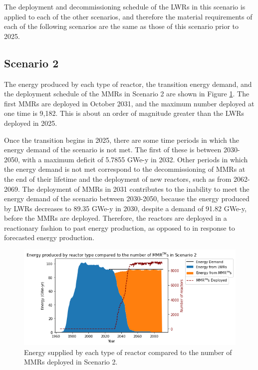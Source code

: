 The deployment and decommissioning schedule of the \glspl{LWR} in this 
scenario is 
applied to each of the other scenarios, and therefore the material 
requirements of each of the following scenarios are the same as those 
of this scenario prior to 2025. 

\subsection{Scenario 2}
The energy produced by each type of reactor, the transition energy demand, 
and the deployment schedule of the \glspl{MMR} in Scenario 2 are shown in 
Figure \ref{fig:energy_rx_2}. The first \glspl{MMR} are deployed in 
October 2031, and the 
maximum number deployed at one time is 
9,182. This is about an order of magnitude greater than the \glspl{LWR}
deployed in 2025.

Once the transition begins in 2025, there are some time periods in which 
the energy demand of the scenario is 
not met. The first of these is between 2030-2050, with a maximum deficit 
of 5.7855 GWe-y in 2032. Other periods in which the energy demand is not met 
correspond to the decommissioning of \glspl{MMR} at the end of their lifetime 
and the deployment of new reactors, such as from 2062-2069. 
The deployment of \glspl{MMR} in 2031 contributes to the inability to 
meet the energy demand of the scenario between 2030-2050, because the energy 
produced by 
\glspl{LWR} decreases to 89.35 GWe-y in 2030, despite a demand of 91.82
GWe-y, before the \glspl{MMR} are 
deployed. Therefore, the reactors are deployed in a reactionary fashion to 
past energy production, as opposed to in response to forecasted energy 
production.

\begin{figure}
    \centering 
    \includegraphics[width=\textwidth]{../figures/energy_scenario2.png}
    \caption{Energy supplied by each type of reactor compared to the number of 
    \glspl{MMR} deployed in Scenario 2.}
    \label{fig:energy_rx_2}
\end{figure}


